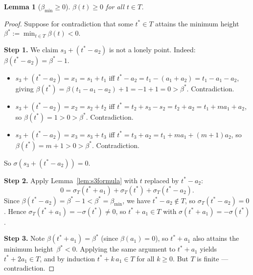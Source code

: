 \documentclass{article}
\newtheorem{lemma}{Lemma}
\begin{document}
\begin{lemma}[$\beta_{\min}\ge 0$]\label{lem:betamin}
$\beta(t)\ge 0$ for all $t\in T$.
\end{lemma}
\begin{proof}
Suppose for contradiction that some $t^*\in T$ attains the minimum height
$\beta^*:=\min_{t\in T}\beta(t)<0$.

\textbf{Step 1.} We claim $s_3+(t^*-a_2)$ is not a lonely point.
Indeed: $\beta(t^*-a_2)=\beta^*-1$.
\begin{itemize}
  \item $s_3+(t^*-a_2)=x_1=s_1+t_1$ iff $t^*-a_2=t_1-(a_1+a_2)=t_1-a_1-a_2$, giving
        $\beta(t^*)=\beta(t_1-a_1-a_2)+1=-1+1=0>\beta^*$.  Contradiction.
  \item $s_3+(t^*-a_2)=x_2=s_2+t_2$ iff $t^*=t_2+s_3-s_2=t_2+a_2=t_1+ma_1+a_2$,
        so $\beta(t^*)=1>0>\beta^*$.  Contradiction.
  \item $s_3+(t^*-a_2)=x_3=s_3+t_3$ iff $t^*=t_3+a_2=t_1+ma_1+(m+1)a_2$,
        so $\beta(t^*)=m+1>0>\beta^*$.  Contradiction.
\end{itemize}
So $\sigma(s_3+(t^*-a_2))=0$.

\textbf{Step 2.} Apply Lemma~\ref{lem:s3formula} with $t$ replaced by $t^*-a_2$:
\[
  0 = \sigma_T(t^*+a_1)+\sigma_T(t^*)+\sigma_T(t^*-a_2).
\]
Since $\beta(t^*-a_2)=\beta^*-1<\beta^*=\beta_{\min}$, we have $t^*-a_2\notin T$, so
$\sigma_T(t^*-a_2)=0$.
Hence $\sigma_T(t^*+a_1)=-\sigma(t^*)\ne 0$, so $t^*+a_1\in T$ with
$\sigma(t^*+a_1)=-\sigma(t^*)$.

\textbf{Step 3.} Note $\beta(t^*+a_1)=\beta^*$ (since $\beta(a_1)=0$), so $t^*+a_1$ also
attains the minimum height~$\beta^*<0$.  Applying the same argument to $t^*+a_1$
yields $t^*+2a_1\in T$, and by induction $t^*+k\,a_1\in T$ for all $k\ge 0$.
But $T$ is finite --- contradiction.
\end{proof}
\end{document}
